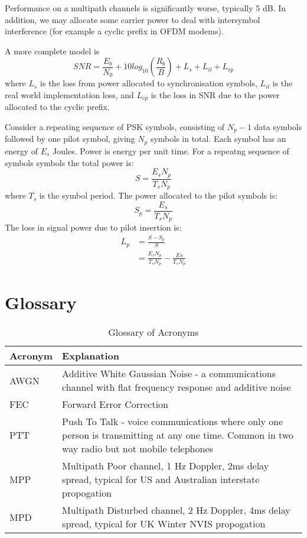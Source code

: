 \documentclass{article}
\begin{document}
Performance on a multipath channels is significantly worse, typically 5 dB.  In addition, we may allocate some carrier power to deal with intersymbol interference (for example a cyclic prefix in OFDM modems).

A more complete model is
\begin{equation}
SNR = \frac{E_b}{N_0} + 10log_{10}\left(\frac{R_b}{B}\right) + L_s + L_{il} + L_{cp}
\end{equation}
where $L_s$ is the loss from power allocated to synchronisation symbols, $L_{il}$ is the real world implementation loss, and $L_{cp}$ is the loss in SNR due to the power allocated to the cyclic prefix.

Consider a repeating sequence of PSK symbols, consisting of $N_p-1$ data symbols followed by one pilot symbol, giving $N_p$ symbols in total.  Each symbol has an energy of $E_s$ Joules.  Power is energy per unit time.  For a repeatng sequence of symbols symbols the total power is:
\begin{equation}
S = \frac{E_sN_p}{T_sN_p}
\end{equation}
where $T_s$ is the symbol period. The power allocated to the pilot symbols is:
\begin{equation}
S_p = \frac{E_s}{T_sN_p}
\end{equation}The loss in signal power due to pilot insertion is:
\begin{equation}
\begin{split}
L_p &= \frac{S - S_p}{S} \\
    &= \frac{E_sN_p}{T_sN_p} - \frac{Es}{T_sN_p}
\end{split}
\end{equation}

\section{Glossary}

\begin{table}[h]
\centering
\begin{tabular}{l m{8cm} }
 \hline
 Acronym & Explanation \\
 \hline
 AWGN & Additive White Gaussian Noise - a communications channel with flat frequency response and additive noise \\
 FEC & Forward Error Correction \\
 PTT & Push To Talk - voice communications where only one person is transmitting at any one time.  Common in two way radio but not mobile telephones  \\
 MPP & Multipath Poor channel, 1 Hz Doppler, 2ms delay spread, typical for US and Australian interstate propogation \\
 MPD & Multipath Disturbed channel, 2 Hz Doppler, 4ms delay spread, typical for UK Winter NVIS propogation \\
 \hline
\end{tabular}
\caption{Glossary of Acronyms}
\end{table}
\end{document}
